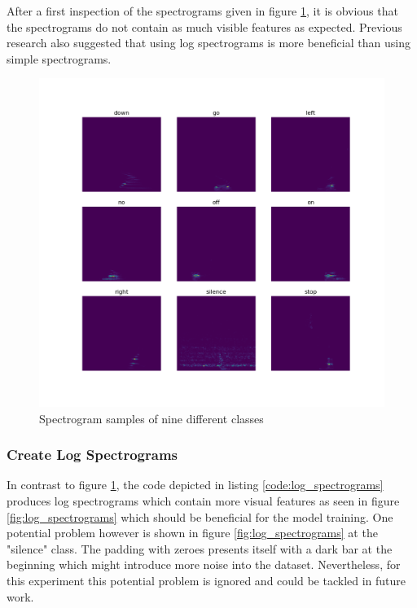 \documentclass{article}
\theoremstyle{definition}
\theoremstyle{remark}
\begin{document}
After a first inspection of the spectrograms given in figure \ref{fig:spectrograms}, it is obvious that the spectrograms do not contain as much visible features as expected. Previous research \cite{gouda2018speech} also suggested that using log spectrograms is more beneficial than using simple spectrograms.


\begin{figure}[h!]
    \centering
    \includegraphics[width=1\textwidth]{img/9_spectrograms.png}
    \caption{Spectrogram samples of nine different classes}
    \label{fig:spectrograms}
\end{figure}

\newpage

\subsubsection{Create Log Spectrograms}

In contrast to figure \ref{fig:spectrograms}, the code depicted in listing \ref{code:log_spectrograms} produces log spectrograms which contain more visual features as seen in figure \ref{fig:log_spectrograms} which should be beneficial for the model training. One potential problem however is shown in figure \ref{fig:log_spectrograms} at the "silence" class. The padding with zeroes presents itself with a dark bar at the beginning which might introduce more noise into the dataset. Nevertheless, for this experiment this potential problem is ignored and could be tackled in future work.
\end{document}
